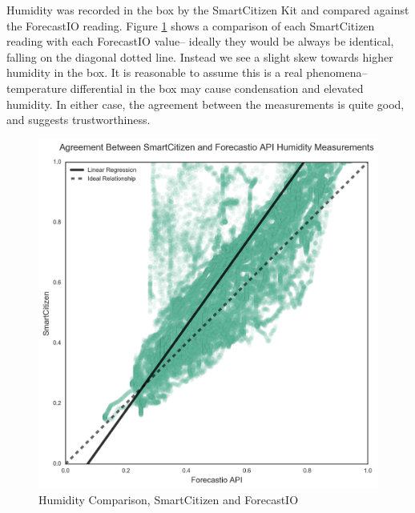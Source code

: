 Humidity was recorded in the box by the SmartCitizen Kit and compared against the ForecastIO reading.  Figure \ref{fig:humidity_sck_v_forecastio} shows a comparison of each SmartCitizen reading with each ForecastIO value-- ideally they would be always be identical, falling on the diagonal dotted line.  Instead we see a slight skew towards higher humidity in the box.  It is reasonable to assume this is a real phenomena-- temperature differential in the box may cause condensation and elevated humidity.  In either case, the agreement between the measurements is quite good, and suggests trustworthiness. 

\begin{figure}[htb]
 	\includegraphics[width=\textwidth]{figs/humidity_sck_v_forecastio}               
 	 \caption{Humidity Comparison, SmartCitizen and ForecastIO}
  	\label{fig:humidity_sck_v_forecastio}
\end{figure}

